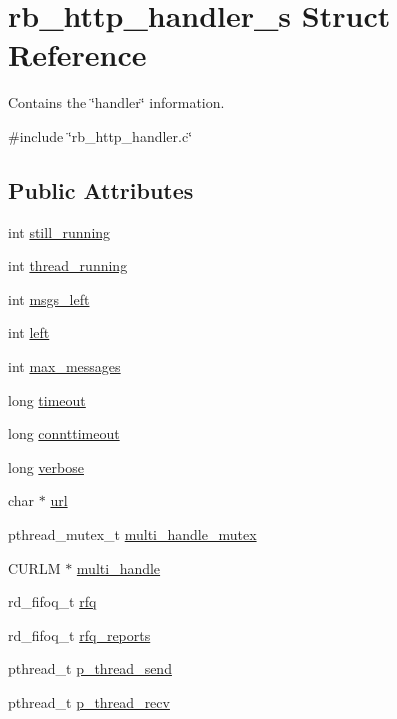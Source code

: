 \hypertarget{structrb__http__handler__s}{\section{rb\-\_\-http\-\_\-handler\-\_\-s Struct Reference}
\label{structrb__http__handler__s}
}


Contains the \char`\"{}handler\char`\"{} information.  




{\ttfamily \#include \char`\"{}rb\-\_\-http\-\_\-handler.\-c\char`\"{}}

\subsection*{Public Attributes}
\begin{DoxyCompactItemize}
\item 
int \hyperlink{structrb__http__handler__s_aa49e97bedda03106912088dad0b75e64}{still\-\_\-running}
\item 
int \hyperlink{structrb__http__handler__s_a978656c7c89a80d411121107c97a0dcd}{thread\-\_\-running}
\item 
int \hyperlink{structrb__http__handler__s_a803db851c00a617f8a80f00f29d9dba3}{msgs\-\_\-left}
\item 
int \hyperlink{structrb__http__handler__s_a6239490836609d286669af640028ae71}{left}
\item 
int \hyperlink{structrb__http__handler__s_ac8ff888740fc0f4c4365fa08fc7d044f}{max\-\_\-messages}
\item 
long \hyperlink{structrb__http__handler__s_a619a5777839d378f50240c703558b4a8}{timeout}
\item 
long \hyperlink{structrb__http__handler__s_ae4538da6abfe51878cf87aa990105c59}{connttimeout}
\item 
long \hyperlink{structrb__http__handler__s_a0bca537c3590135753bdd217559bb422}{verbose}
\item 
char $\ast$ \hyperlink{structrb__http__handler__s_a1f0df317f6eca7893bb08a54f13870ef}{url}
\item 
pthread\-\_\-mutex\-\_\-t \hyperlink{structrb__http__handler__s_add4e2b7495e2f20396c2e70ab1a27bf4}{multi\-\_\-handle\-\_\-mutex}
\item 
C\-U\-R\-L\-M $\ast$ \hyperlink{structrb__http__handler__s_a45c0ce1f2e4d154d0194bb60569c0faf}{multi\-\_\-handle}
\item 
rd\-\_\-fifoq\-\_\-t \hyperlink{structrb__http__handler__s_a39160211aefb64ec052138229da98632}{rfq}
\item 
rd\-\_\-fifoq\-\_\-t \hyperlink{structrb__http__handler__s_a383f2047cfcdd9fe49d0deacf770a73c}{rfq\-\_\-reports}
\item 
pthread\-\_\-t \hyperlink{structrb__http__handler__s_ae969c34a0421fe32951cb31802735f13}{p\-\_\-thread\-\_\-send}
\item 
pthread\-\_\-t \hyperlink{structrb__http__handler__s_a4d36d51983f56eac71371a39ee421242}{p\-\_\-thread\-\_\-recv}
\end{DoxyCompactItemize}


